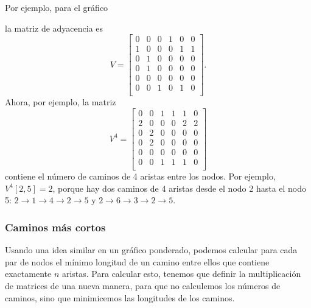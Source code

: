 Por ejemplo, para el gráfico
\begin{center}
\end{center}
la matriz de adyacencia es
\[
V= \begin{bmatrix}
  0 & 0 & 0 & 1 & 0 & 0 \\
  1 & 0 & 0 & 0 & 1 & 1 \\
  0 & 1 & 0 & 0 & 0 & 0 \\
  0 & 1 & 0 & 0 & 0 & 0 \\
  0 & 0 & 0 & 0 & 0 & 0 \\
  0 & 0 & 1 & 0 & 1 & 0 \\
 \end{bmatrix}.
\]
Ahora, por ejemplo, la matriz
\[
V^4= \begin{bmatrix}
  0 & 0 & 1 & 1 & 1 & 0 \\
  2 & 0 & 0 & 0 & 2 & 2 \\
  0 & 2 & 0 & 0 & 0 & 0 \\
  0 & 2 & 0 & 0 & 0 & 0 \\
  0 & 0 & 0 & 0 & 0 & 0 \\
  0 & 0 & 1 & 1 & 1 & 0 \\
 \end{bmatrix}
\]
contiene el número de caminos de 4 aristas
entre los nodos.
Por ejemplo, $V^4[2,5]=2$,
porque hay dos caminos de 4 aristas
desde el nodo 2 hasta el nodo 5:
$2 \rightarrow 1 \rightarrow 4 \rightarrow 2 \rightarrow 5$
y 
$2 \rightarrow 6 \rightarrow 3 \rightarrow 2 \rightarrow 5$.

\subsubsection{Caminos más cortos}

Usando una idea similar en un gráfico ponderado,
podemos calcular para cada par de nodos el mínimo
longitud de un camino
entre ellos que contiene exactamente $n$ aristas.
Para calcular esto, tenemos que definir la multiplicación de matrices
de una nueva manera, para que no calculemos los números
de caminos, sino que minimicemos las longitudes de los caminos.

